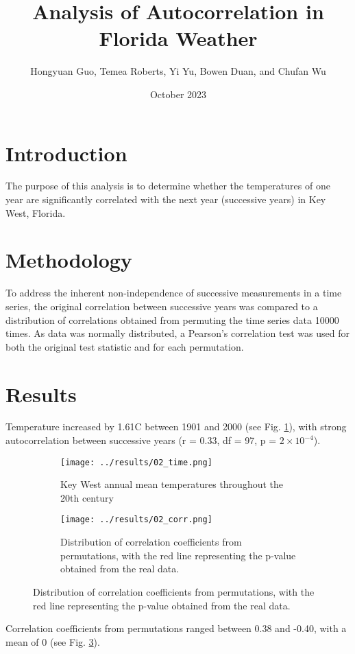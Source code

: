 \documentclass[12pt,a4paper]{article}
\title{Analysis of Autocorrelation in Florida Weather}
\author{Hongyuan Guo, Temea Roberts, Yi Yu, Bowen Duan, and Chufan Wu}
\date{October 2023}
\begin{document}
\maketitle

\section{Introduction}
The purpose of this analysis is to determine whether the temperatures of one year are significantly correlated with the next year (successive years) in Key West, Florida.

\section{Methodology}
To address the inherent non-independence of successive measurements in a time series, the original correlation between successive years was compared to a distribution of correlations obtained from permuting the time series data 10000 times. As data was normally distributed, a Pearson's correlation test was used for both the original test statistic and for each permutation. 

\section{Results}
Temperature increased by 1.61\textdegree C between 1901 and 2000 (see Fig. \ref{fig:time}), with strong autocorrelation between successive years (r = 0.33, df = 97, p = \(2 \times 10^{-4}\)). 

\begin{figure}[h]
\centering
\begin{subfigure}{0.45\textwidth}
    \texttt{[image: ../results/02\_time.png]}
    \caption{Key West annual mean temperatures throughout the 20th century}
    \label{fig:time}
\end{subfigure}
\hfill
\begin{subfigure}{0.45\textwidth}
    \texttt{[image: ../results/02\_corr.png]}
    \caption{Distribution of correlation coefficients from permutations, with the red line representing the p-value obtained from the real data.}
    \label{fig:corr}
\end{subfigure}
\end{figure}

Correlation coefficients from permutations ranged between 0.38 and -0.40, with a mean of 0 (see Fig. \ref{fig:corr}).
\end{document}
